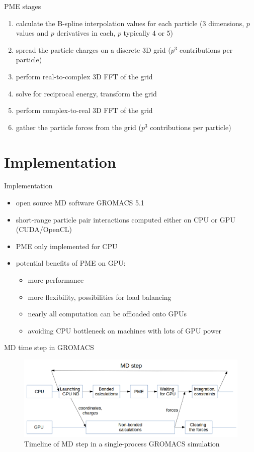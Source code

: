 \documentclass[11pt]{beamer}
\begin{document}
\begin{frame}{PME stages}
\begin{enumerate}
\item calculate the B-spline interpolation values for each particle
(3 dimensions, $p$ values and $p$ derivatives in each, $p$ typically 4 or 5)
\item spread the particle charges on a discrete 3D grid ($p^3$ contributions per particle)
\item perform real-to-complex 3D FFT of the grid
\item solve for reciprocal energy, transform the grid
\item perform complex-to-real 3D FFT of the grid
\item gather the particle forces from the grid ($p^3$ contributions per particle)
\end{enumerate}
\end{frame}


\section{Implementation}
\begin{frame}{Implementation}
\begin{itemize}
\item open source MD software GROMACS 5.1
\item short-range particle pair interactions computed either on CPU or GPU (CUDA/OpenCL) 
\item PME only implemented for CPU
\item potential benefits of PME on GPU:
\begin{itemize}
\item more performance
\item more flexibility, possibilities for load balancing 
\item nearly all computation can be offloaded onto GPUs
\item avoiding CPU bottleneck on machines with lots of GPU power  
\end{itemize}
\end{itemize}
\end{frame}

\begin{frame}{MD time step in GROMACS}
\begin{figure}
    \centering
    \includegraphics[width=1\textwidth]{pics/mdstep-orig.png}
    \caption{Timeline of MD step in a single-process GROMACS simulation}
    \label{fig:step-orig}
\end{figure}
\FloatBarrier
\end{frame}
\end{document}

